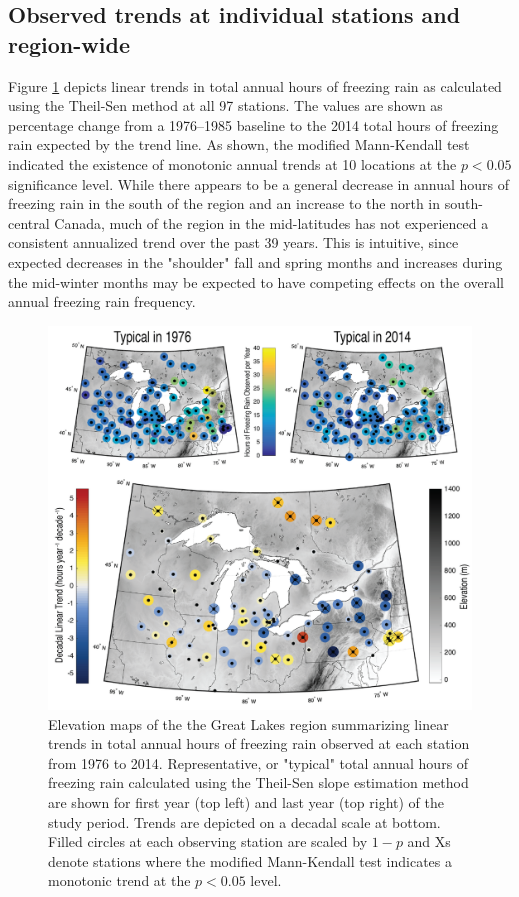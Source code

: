 \documentclass[twocol]{ametsoc}
\begin{document}
\subsection{Observed trends at individual stations and region-wide}


Figure \ref{fig:trendmap} depicts linear trends in total annual hours of freezing rain as calculated using the Theil-Sen method at all 97 stations. The values are shown as percentage change from a 1976--1985 baseline to the 2014 total hours of freezing rain expected by the trend line. As shown, the modified Mann-Kendall test indicated the existence of monotonic annual trends at 10 locations at the $p<0.05$ significance level. While there appears to be a general decrease in annual hours of freezing rain in the south of the region and an increase to the north in south-central Canada, much of the region in the mid-latitudes has not experienced a consistent annualized trend over the past 39 years. This is intuitive, since expected decreases in the "shoulder" fall and spring months and increases during the mid-winter months may be expected to have competing effects on the overall annual freezing rain frequency.

\begin{figure}
\centering
\includegraphics[width=1.0\textwidth]{FZRA_trend_maps.png}
\caption{\label{fig:trendmap}Elevation maps of the the Great Lakes region summarizing linear trends in total annual hours of freezing rain observed at each station from 1976 to 2014. Representative, or "typical" total annual hours of freezing rain calculated using the Theil-Sen slope estimation method are shown for first year (top left) and last year (top right) of the study period. Trends are depicted on a decadal scale at bottom. Filled circles at each observing station are scaled by $1 - p$ and Xs denote stations where the modified Mann-Kendall test indicates a monotonic trend at the $p<0.05$ level.}
\end{figure}
\end{document}
